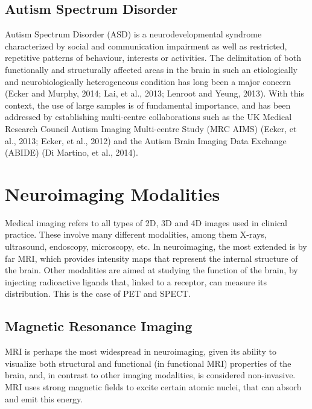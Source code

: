 \subsection{Autism Spectrum Disorder}
Autism Spectrum Disorder (ASD) is a neurodevelopmental syndrome characterized by social and communication impairment as well as restricted, repetitive patterns of behaviour, interests or activities. The delimitation of both functionally and structurally affected areas in the brain in such an etiologically and neurobiologically heterogeneous condition has long been a major concern (Ecker and Murphy, 2014; Lai, et al., 2013; Lenroot and Yeung, 2013). With this context, the use of large samples is of fundamental importance, and has been addressed by establishing multi-centre collaborations such as the UK Medical Research Council Autism Imaging Multi-centre Study (MRC AIMS) (Ecker, et al., 2013; Ecker, et al., 2012) and the Autism Brain Imaging Data Exchange (ABIDE) (Di Martino, et al., 2014).


\section{Neuroimaging Modalities}\label{sec:neuroimaging}
Medical imaging refers to all types of 2D, 3D and 4D images used in clinical practice. These involve many different modalities, among them X-rays, ultrasound, endoscopy, microscopy, etc. In neuroimaging, the most extended is by far \ac{MRI}, which provides intensity maps that represent the internal structure of the brain. Other modalities are aimed at studying the function of the brain, by injecting radioactive ligands that, linked to a receptor, can measure its distribution. This is the case of \ac{PET} and \ac{SPECT}.

\subsection{Magnetic Resonance Imaging}
\acf{MRI} is perhaps the most widespread in neuroimaging, given its ability to visualize both structural and functional (in functional \ac{MRI}) properties of the brain, and, in contrast to other imaging modalities, is considered non-invasive. \ac{MRI} uses strong magnetic fields to excite certain atomic nuclei, that can absorb and emit this energy. 

